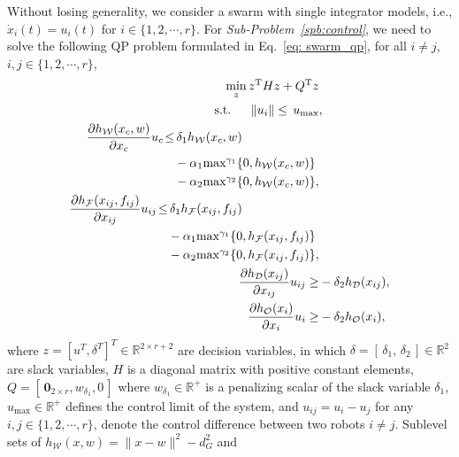 \documentclass[letterpaper, 10 pt, conference]{ieeeconf}
\begin{document}
Without losing generality, we consider a swarm with single integrator models, i.e., $\dot{x}_i(t) \!=\! u_i(t)$  for $i\!\in\!\{1,2,\cdots,r\}$. For \textit{Sub-Problem~\ref{spb:control}}, we need to solve the following QP problem formulated in Eq.~\eqref{eq: swarm_qp}, for all $i \!\neq\! j$, $i,j \!\in\! \{1,2,\cdots,r\}$,
\begin{subequations}
\vspace{0.1cm}
\label{eq: swarm_qp}
\begin{align}
\min _{z}  \textstyle  z^{\mathrm{T}} H z  +Q^{\mathrm{T}} z & \\
\text { s.}\text{t. } \quad \left\| u_i \right\| \leq\, u_{\max}&, \label{subeq: limit}\\
\begin{split}
\frac{\partial h_{\mathcal{W}}(x_c, w)}{\partial x_c}  u_c  \!\leq&\,   \delta_1 h_{\mathcal{W}}(x_c,w)\\
&\textstyle - \alpha_1\! \max^{\gamma_1} \{0, h_{\mathcal{W}}(x_c, w)\}\\
&\textstyle -\alpha_2\! \max^{\gamma_2} \{0, h_{\mathcal{W}}(x_c, w)\},
 \label{subeq: center}
\end{split} \\
\begin{split}
\frac{\partial h_{\mathcal{F}}(x_{ij}, f_{ij})}{\partial x_{ij}}  u_{ij} \!\leq&\, \delta_1 h_{\mathcal{F}}(x_{ij}, f_{ij}) \\
&\textstyle -\alpha_1 \!\max^{\gamma_1} \{0, h_{\mathcal{F}}(x_{ij}, f_{ij})\} \\
&\textstyle -\alpha_2 \!\max^{\gamma_2} \{0, h_{\mathcal{F}}(x_{ij}, f_{ij})\},
\label{subeq: form}
\end{split} \\
 \frac{\partial h_{\mathcal{D}}(x_{ij})}{\partial x_{ij}} u_{ij} \geq & -\delta_2 h_{\mathcal{D}}(x_{ij}), \label{subeq: collision}\\
\frac{\partial h_{\mathcal{O}}(x_i)}{\partial x_i} u_i \geq & -\delta_2 h_{\mathcal{O}}(x_i),\label{subeq: obs}
\end{align}
\end{subequations}
where $z = [u^T, \delta^T]^T\!\in\!\mathbb{R}^{2 \times r + 2}$ are decision variables, in which $\delta\!=\![\,\delta_1,\,\delta_2\,] \in \mathbb{R}^2$ are slack variables, $H$ is a diagonal matrix with positive constant elements, $Q\!=\![\,\mathbf{0}_{2\times r}, w_{\delta_1}, 0\,]$ where $w_{\delta_1}\!\in\!\mathbb{R}^+$ is a penalizing scalar of the slack variable $\delta_1$, $u_{\max}\!\in\!\mathbb{R}^+$ defines the control limit of the system, and $u_{ij}\!=\!u_{i}-u_{j}$ for any $i,j\in\{1,2,\cdots,r\}$, denote the control difference between two robots $i\neq j$. Sublevel sets of $h_{\mathcal{W}}(x, w) \!=\! \|x-w \|^2  \!-\! d_G^2$ and
\end{document}
